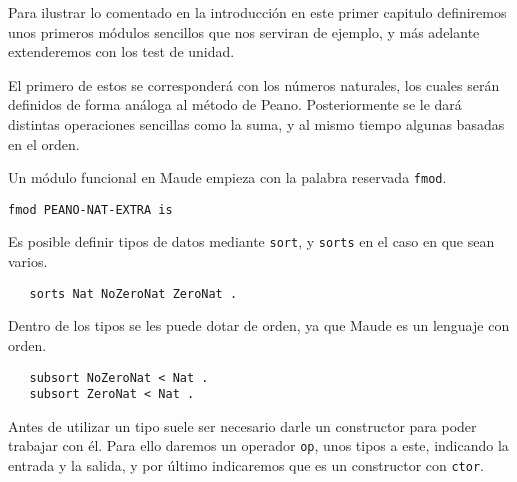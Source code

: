 

Para ilustrar lo comentado en la introducción en este primer capitulo definiremos unos primeros módulos sencillos que nos serviran de ejemplo, y más adelante extenderemos con los test de unidad. \par
El primero de estos se corresponderá con los números naturales, los cuales ser\'an definidos de forma análoga al método de Peano. Posteriormente se le dará distintas operaciones sencillas como la suma, y al mismo tiempo algunas basadas en el orden.\par


Un módulo funcional en Maude empieza con la palabra reservada \texttt{fmod}. \par

{\codesize
\begin{verbatim}
fmod PEANO-NAT-EXTRA is
\end{verbatim}
}

Es posible definir tipos de datos mediante \texttt{sort}, y \texttt{sorts} en el caso en que sean varios. \par

{\codesize
\begin{verbatim}
   sorts Nat NoZeroNat ZeroNat .
\end{verbatim}
}

Dentro de los tipos se les puede dotar de orden, ya que Maude es un lenguaje con orden. \par

{\codesize
\begin{verbatim}
   subsort NoZeroNat < Nat .
   subsort ZeroNat < Nat .
\end{verbatim}
}

Antes de utilizar un tipo suele ser necesario darle un constructor para poder trabajar con él. Para ello daremos un operador \texttt{op}, unos tipos a este, indicando la entrada y la salida, y por último indicaremos que es un constructor con  \texttt{ctor}. \par


